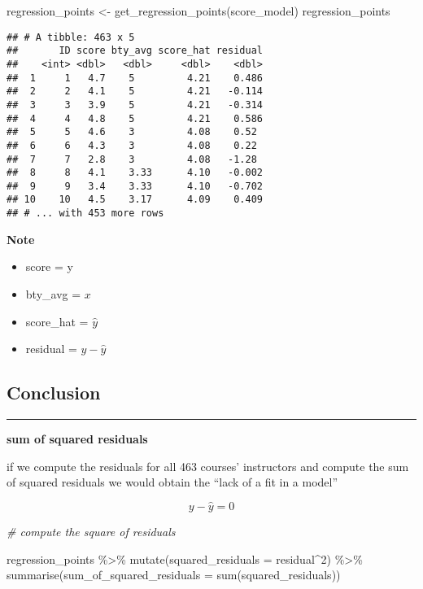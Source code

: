 \documentclass[
]{article}
\newenvironment{Shaded}{\begin{snugshade}}{\end{snugshade}}
\newcommand{\AttributeTok}[1]{\textcolor[rgb]{0.77,0.63,0.00}{#1}}
\newcommand{\CommentTok}[1]{\textcolor[rgb]{0.56,0.35,0.01}{\textit{#1}}}
\newcommand{\DecValTok}[1]{\textcolor[rgb]{0.00,0.00,0.81}{#1}}
\newcommand{\FunctionTok}[1]{\textcolor[rgb]{0.00,0.00,0.00}{#1}}
\newcommand{\NormalTok}[1]{#1}
\newcommand{\OtherTok}[1]{\textcolor[rgb]{0.56,0.35,0.01}{#1}}
\newcommand{\SpecialCharTok}[1]{\textcolor[rgb]{0.00,0.00,0.00}{#1}}
\begin{document}
\begin{Shaded}
\begin{Highlighting}[]
\NormalTok{regression\_points }\OtherTok{\textless{}{-}} \FunctionTok{get\_regression\_points}\NormalTok{(score\_model)}
\NormalTok{regression\_points}
\end{Highlighting}
\end{Shaded}

\begin{verbatim}
## # A tibble: 463 x 5
##       ID score bty_avg score_hat residual
##    <int> <dbl>   <dbl>     <dbl>    <dbl>
##  1     1   4.7    5         4.21    0.486
##  2     2   4.1    5         4.21   -0.114
##  3     3   3.9    5         4.21   -0.314
##  4     4   4.8    5         4.21    0.586
##  5     5   4.6    3         4.08    0.52 
##  6     6   4.3    3         4.08    0.22 
##  7     7   2.8    3         4.08   -1.28 
##  8     8   4.1    3.33      4.10   -0.002
##  9     9   3.4    3.33      4.10   -0.702
## 10    10   4.5    3.17      4.09    0.409
## # ... with 453 more rows
\end{verbatim}

\textbf{Note}

\begin{itemize}
\item
  score = y
\item
  bty\_avg = \(x\)
\item
  score\_hat = \(\hat{y}\)
\item
  residual = \(y-\hat{y}\)
\end{itemize}

\hypertarget{conclusion}{%
\subsection{Conclusion}\label{conclusion}}

\begin{center}\rule{0.5\linewidth}{0.5pt}\end{center}

\textbf{sum of squared residuals}

if we compute the residuals for all 463 courses' instructors and compute
the sum of squared residuals we would obtain the ``lack of a fit in a
model''

\[ y - \hat{y} = 0\]

\begin{Shaded}
\begin{Highlighting}[]
\CommentTok{\# compute the square of residuals}

\NormalTok{regression\_points }\SpecialCharTok{\%\textgreater{}\%} 
  \FunctionTok{mutate}\NormalTok{(}\AttributeTok{squared\_residuals =}\NormalTok{ residual}\SpecialCharTok{\^{}}\DecValTok{2}\NormalTok{) }\SpecialCharTok{\%\textgreater{}\%} 
  \FunctionTok{summarise}\NormalTok{(}\AttributeTok{sum\_of\_squared\_residuals =} \FunctionTok{sum}\NormalTok{(squared\_residuals))}
\end{Highlighting}
\end{Shaded}
\end{document}
